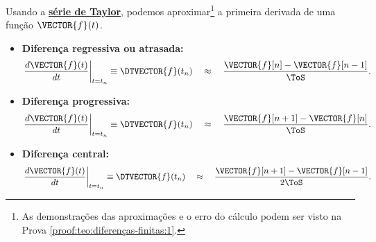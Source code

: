 \begin{theorem}
\label{teo:diferenças-finitas:1}
Usando a \hyperref[def:taylor]{\textbf{série de Taylor}}, podemos aproximar\footnote{As
demonstrações das aproximações e o erro do cálculo podem ser visto na Prova \ref{proof:teo:diferenças-finitas:1}.} 
a primeira derivada de uma função $\VECTOR{f}(t)$.
\begin{itemize}
\item \textbf{Diferença regressiva ou atrasada:}
\begin{equation}
\left.\frac{d\VECTOR{f}(t)}{dt}\right|_{t=t_n}\equiv \DTVECTOR{f}(t_n)
\quad \approx \quad
\frac{\VECTOR{f}[n]-\VECTOR{f}[n-1]}{\ToS}.
\end{equation}
\item \textbf{Diferença progressiva:}
\begin{equation}
\left.\frac{d\VECTOR{f}(t)}{dt}\right|_{t=t_n}\equiv \DTVECTOR{f}(t_n)
\quad \approx \quad
\frac{\VECTOR{f}[n+1]-\VECTOR{f}[n]}{\ToS}.
\end{equation}
\item \textbf{Diferença central:}
\begin{equation}
\left.\frac{d\VECTOR{f}(t)}{dt}\right|_{t=t_n}\equiv \DTVECTOR{f}(t_n)
\quad \approx \quad
\frac{\VECTOR{f}[n+1]-\VECTOR{f}[n-1]}{2\ToS}.
\end{equation}
\end{itemize}
\end{theorem}



